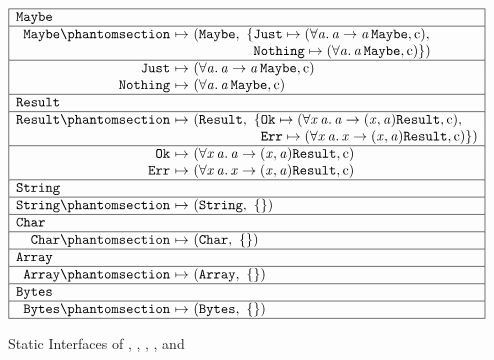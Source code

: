 \begin{figure}[htbp]
\centering
\small
\[
\begin{array}{|r@{\ }c@{\ }l|}
\hline
\multicolumn{3}{|l|}{\kw{Maybe}}\\
\hline
\kw{Maybe}\citelabel{b:Maybe.Maybe} & \mapsto & (\tMaybe,\ \{\kw{Just} \mapsto (\forall\mv{a}.\,\mv{a} \rightarrow \mv{a}\,\tMaybe, \isc),\\
 & & \phantom{(\tMaybe,\ \{}\kw{Nothing} \mapsto (\forall\mv{a}.\,\mv{a}\,\tMaybe, \isc)\})\\
\hline
\kw{Just}\citealso{b:Maybe.Maybe} & \mapsto & (\forall\mv{a}.\,\mv{a} \rightarrow \mv{a}\,\tMaybe, \isc)\\
\kw{Nothing}\citealso{b:Maybe.Maybe} & \mapsto & (\forall\mv{a}.\,\mv{a}\,\tMaybe, \isc)\\
\hline
\multicolumn{3}{|l|}{\kw{Result}}\\
\hline
\kw{Result}\citelabel{b:Result.Result} & \mapsto & (\sbtResult,\ \{\kw{Ok} \mapsto (\forall\mv{x}\,\mv{a}.\,\mv{a} \rightarrow (\mv{x}, \mv{a})\sbtResult, \isc),\\
 & & \phantom{(\sbtResult,\ \{}\kw{Err} \mapsto (\forall\mv{x}\,\mv{a}.\,\mv{x} \rightarrow (\mv{x}, \mv{a})\sbtResult, \isc)\})\\
\hline
\kw{Ok}\citealso{b:Result.Result} & \mapsto & (\forall\mv{x}\,\mv{a}.\,\mv{a} \rightarrow (\mv{x}, \mv{a})\sbtResult, \isc)\\
\kw{Err}\citealso{b:Result.Result} & \mapsto & (\forall\mv{x}\,\mv{a}.\,\mv{x} \rightarrow (\mv{x}, \mv{a})\sbtResult, \isc)\\
\hline
\multicolumn{3}{|l|}{\kw{String}}\\
\hline
\kw{String}\citelabel{b:String.String} & \mapsto & (\tString,\ \emptymap)\\
\hline
\multicolumn{3}{|l|}{\kw{Char}}\\
\hline
\kw{Char}\citelabel{b:Char.Char} & \mapsto & (\tChar,\ \emptymap)\\
\hline
\multicolumn{3}{|l|}{\kw{Array}}\\
\hline
\kw{Array}\citelabel{b:Array.Array} & \mapsto & (\tArray,\ \emptymap)\\
\hline
\multicolumn{3}{|l|}{\kw{Bytes}}\\
\hline
\kw{Bytes}\citelabel{b:Bytes.Bytes} & \mapsto & (\tBytes,\ \emptymap)\\
\hline
\end{array}
\]
\caption{Static Interfaces of , , ,
,  and }\label{fig:static-basis-data}
\end{figure}

